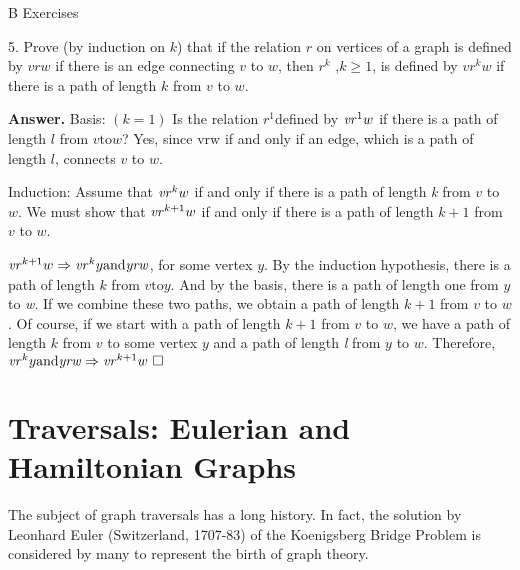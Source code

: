 \documentclass[10pt,]{book}
\theoremstyle{plain}
\theoremstyle{definition}
\theoremstyle{definition}
\theoremstyle{definition}
\theoremstyle{definition}
\theoremstyle{definition}
\numberwithin{equation}{section}
\begin{document}
\par\smallskip\noindent
\hypertarget{exercisegroup-4}{}\typeout{************************************************}
\typeout{************************************************}
B Exercises%
\begin{exercisegroup}
\item[5.]\hypertarget{exercise-20}{} Prove (by induction on \(k\)) that if the relation \(r\) on vertices of a graph is defined by \(v r w\) if there is an edge connecting
\(v\) to \(w\), then \(r^k\) ,\(k \geq  1\), is defined by \(v r^kw\) if there is a path of length \(k\) from \(v\) to
\(w\).%
\par\smallskip
\par\smallskip
\noindent\textbf{Answer.}\hypertarget{answer-5}{}\quad
 Basis: \((k=1)\) Is the relation \(r^1\)defined by \(\text{\textit{vr}}^1w\) if there is a path of length \(l\) from \(v \text{to} w\)? Yes, since
\textit{ \(\text{vrw}\)} if and only if an edge, which is a path of length \(l\), connects \(v\) to \(w\).%
\par
Induction: Assume that \(\text{\textit{vr}}^kw\) if and only if there is a path of length \textit{ k }from \(v\) to \(w\). We must show
that \(\text{\textit{vr}}^{k+1}w\) if and only if there is a path of length \(k+1\) from \(v\) to \(w\).%
\par

\(\text{\textit{vr}}^{k+1}w\Rightarrow \text{\textit{vr}}^ky \text{and} \text{\textit{yrw}}\), for some vertex \(y\). By the induction
hypothesis, there is a path of length \(k\) from \(v \text{to} y\). And by the basis, there is a path of length one from \(y\) to \textit{
w}. If we combine these two paths, we obtain a path of length \(k+1\) from \(v\) to \(w\). Of course, if we start with a path of length
\(k+1\) from \(v\) to \(w\), we have a path of length \(k\) from \(v\) to some vertex \(y\) and a path of length\textit{
 l} from \(y\) to \(w\). Therefore, \(\text{\textit{vr}}^ky \text{and} \text{\textit{yrw}}\Rightarrow \text{\textit{vr}}^{k+1}w\text{
   }\square\)
%
\end{exercisegroup}
\par\smallskip\noindent
\typeout{************************************************}
\typeout{************************************************}
\section[Traversals: Eulerian and Hamiltonian Graphs]{Traversals: Eulerian and Hamiltonian Graphs}\label{s-traversals}
\typeout{************************************************}
\typeout{************************************************}
The subject of graph traversals has a long history. In fact, the solution by Leonhard Euler (Switzerland, 1707-83) of the Koenigsberg Bridge
Problem is considered by many to represent the birth of graph theory.%
\typeout{************************************************}
\typeout{************************************************}
\end{document}
